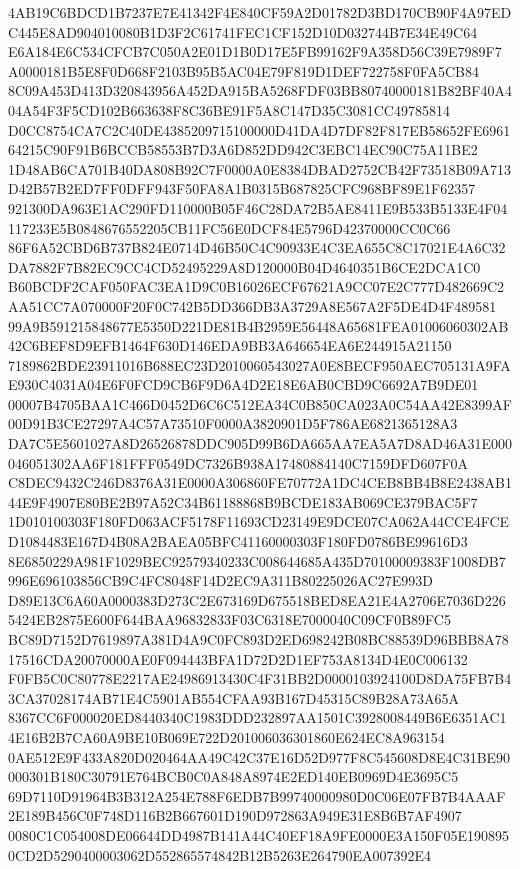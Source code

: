 \documentclass[UTF8,fontset=fandol,zihao=-4,a4paper]{ctexart}
\begin{document}
{{4AB19C6BDCD1B7237E7E41342F4E840CF59A2D01782D3BD170CB90F4A97EDC445E8AD904010080B1D3F2C61741FEC1CF152D10D032744B7E34E49C64
E6A184E6C534CFCB7C050A2E01D1B0D17E5FB99162F9A358D56C39E7989F7A0000181B5E8F0D668F2103B95B5AC04E79F819D1DEF722758F0FA5CB84
8C09A453D413D320843956A452DA915BA5268FDF03BB80740000181B82BF40A404A54F3F5CD102B663638F8C36BE91F5A8C147D35C3081CC49785814
D0CC8754CA7C2C40DE4385209715100000D41DA4D7DF82F817EB58652FE696164215C90F91B6BCCB58553B7D3A6D852DD942C3EBC14EC90C75A11BE2
1D48AB6CA701B40DA808B92C7F0000A0E8384DBAD2752CB42F73518B09A713D42B57B2ED7FF0DFF943F50FA8A1B0315B687825CFC968BF89E1F62357
921300DA963E1AC290FD110000B05F46C28DA72B5AE8411E9B533B5133E4F04117233E5B0848676552205CB11FC56E0DCF84E5796D42370000CC0C66
86F6A52CBD6B737B824E0714D46B50C4C90933E4C3EA655C8C17021E4A6C32DA7882F7B82EC9CC4CD52495229A8D120000B04D4640351B6CE2DCA1C0
B60BCDF2CAF050FAC3EA1D9C0B16026ECF67621A9CC07E2C777D482669C2AA51CC7A070000F20F0C742B5DD366DB3A3729A8E567A2F5DE4D4F489581
99A9B591215848677E5350D221DE81B4B2959E56448A65681FEA01006060302AB42C6BEF8D9EFB1464F630D146EDA9BB3A646654EA6E244915A21150
7189862BDE23911016B688EC23D2010060543027A0E8BECF950AEC705131A9FAE930C4031A04E6F0FCD9CB6F9D6A4D2E18E6AB0CBD9C6692A7B9DE01
00007B4705BAA1C466D0452D6C6C512EA34C0B850CA023A0C54AA42E8399AF00D91B3CE27297A4C57A73510F0000A3820901D5F786AE6821365128A3
DA7C5E5601027A8D26526878DDC905D99B6DA665AA7EA5A7D8AD46A31E000046051302AA6F181FFF0549DC7326B938A17480884140C7159DFD607F0A
C8DEC9432C246D8376A31E0000A306860FE70772A1DC4CEB8BB4B8E2438AB144E9F4907E80BE2B97A52C34B61188868B9BCDE183AB069CE379BAC5F7
1D010100303F180FD063ACF5178F11693CD23149E9DCE07CA062A44CCE4FCED1084483E167D4B08A2BAEA05BFC41160000303F180FD0786BE99616D3
8E6850229A981F1029BEC92579340233C008644685A435D70100009383F1008DB7996E696103856CB9C4FC8048F14D2EC9A311B80225026AC27E993D
D89E13C6A60A0000383D273C2E673169D675518BED8EA21E4A2706E7036D2265424EB2875E600F644BAA96832833F03C6318E7000040C09CF0B89FC5
BC89D7152D7619897A381D4A9C0FC893D2ED698242B08BC88539D96BBB8A7817516CDA20070000AE0F094443BFA1D72D2D1EF753A8134D4E0C006132
F0FB5C0C80778E2217AE24986913430C4F31BB2D0000103924100D8DA75FB7B43CA37028174AB71E4C5901AB554CFAA93B167D45315C89B28A73A65A
8367CC6F000020ED8440340C1983DDD232897AA1501C3928008449B6E6351AC14E16B2B7CA60A9BE10B069E722D201006036301860E624EC8A963154
0AE512E9F433A820D020464AA49C42C37E16D52D977F8C545608D8E4C31BE90000301B180C30791E764BCB0C0A848A8974E2ED140EB0969D4E3695C5
69D7110D91964B3B312A254E788F6EDB7B99740000980D0C06E07FB7B4AAAF2E189B456C0F748D116B2B667601D190D972863A949E31E8B6B7AF4907
0080C1C054008DE06644DD4987B141A44C40EF18A9FE0000E3A150F05E1908950CD2D5290400003062D552865574842B12B5263E264790EA007392E4
}}
\end{document}
